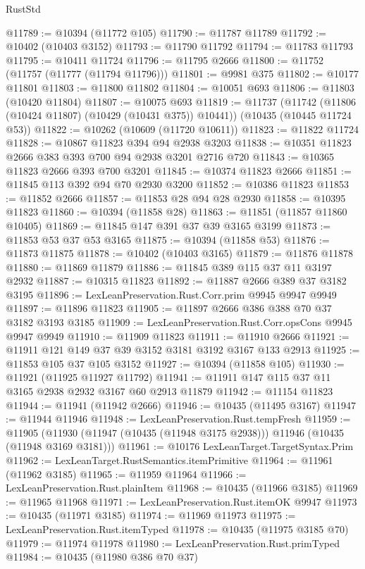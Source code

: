 \begin{lexlean}{RustStd}
\begin{coremodule}
@11789 := @10394 (@11772 @105)
@11790 := @11787 @11789
@11792 := @10402 (@10403 @3152)
@11793 := @11790 @11792
@11794 := @11783 @11793
@11795 := @10411 @11724
@11796 := @11795 @2666
@11800 := @11752 (@11757 (@11777 (@11794 @11796)))
@11801 := @9981 @375
@11802 := @10177 @11801
@11803 := @11800 @11802
@11804 := @10051 @693
@11806 := @11803 (@10420 @11804)
@11807 := @10075 @693
@11819 := @11737
    (@11742 (@11806 (@10424 @11807) (@10429 (@10431 @375)) @10441))
    (@10435 (@10445 @11724 @53))
@11822 := @10262 (@10609 (@11720 @10611))
@11823 := @11822 @11724
@11828 := @10867 @11823 @394 @94 @2938 @3203
@11838 := @10351 @11823 @2666 @383 @393 @700 @94 @2938 @3201 @2716 @720
@11843 := @10365 @11823 @2666 @393 @700 @3201
@11845 := @10374 @11823 @2666
@11851 := @11845 @113 @392 @94 @70 @2930 @3200
@11852 := @10386 @11823
@11853 := @11852 @2666
@11857 := @11853 @28 @94 @28 @2930
@11858 := @10395 @11823
@11860 := @10394 (@11858 @28)
@11863 := @11851 (@11857 @11860 @10405)
@11869 := @11845 @147 @391 @37 @39 @3165 @3199
@11873 := @11853 @53 @37 @53 @3165
@11875 := @10394 (@11858 @53)
@11876 := @11873 @11875
@11878 := @10402 (@10403 @3165)
@11879 := @11876 @11878
@11880 := @11869 @11879
@11886 := @11845 @389 @115 @37 @11 @3197 @2932
@11887 := @10315 @11823
@11892 := @11887 @2666 @389 @37 @3182 @3195
@11896 := LexLeanPreservation.Rust.Corr.prim @9945 @9947 @9949
@11897 := @11896 @11823
@11905 := @11897 @2666 @386 @388 @70 @37 @3182 @3193 @3185
@11909 := LexLeanPreservation.Rust.Corr.opsCons @9945 @9947 @9949
@11910 := @11909 @11823
@11911 := @11910 @2666
@11921 := @11911 @121 @149 @37 @39 @3152 @3181 @3192 @3167 @133 @2913
@11925 := @11853 @105 @37 @105 @3152
@11927 := @10394 (@11858 @105)
@11930 := @11921 (@11925 @11927 @11792)
@11941 := @11911 @147 @115 @37 @11 @3165 @2938 @2932 @3167 @60 @2913 @11879
@11942 := @11154 @11823
@11944 := @11941 (@11942 @2666)
@11946 := @10435 (@11495 @3167)
@11947 := @11944 @11946
@11948 := LexLeanPreservation.Rust.tempFresh
@11959 := @11905
    (@11930 (@11947 (@10435 (@11948 @3175 @2938))) @11946 (@10435 (@11948 @3169 @3181)))
@11961 := @10176 LexLeanTarget.TargetSyntax.Prim
@11962 := LexLeanTarget.RustSemantics.itemPrimitive
@11964 := @11961 (@11962 @3185)
@11965 := @11959 @11964
@11966 := LexLeanPreservation.Rust.plainItem
@11968 := @10435 (@11966 @3185)
@11969 := @11965 @11968
@11971 := LexLeanPreservation.Rust.itemOK @9947
@11973 := @10435 (@11971 @3185)
@11974 := @11969 @11973
@11975 := LexLeanPreservation.Rust.itemTyped
@11978 := @10435 (@11975 @3185 @70)
@11979 := @11974 @11978
@11980 := LexLeanPreservation.Rust.primTyped
@11984 := @10435 (@11980 @386 @70 @37)

\end{coremodule}
\end{lexlean}

